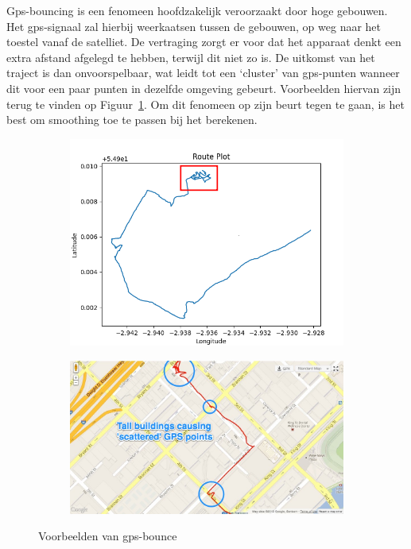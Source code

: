 Gps-bouncing is een fenomeen hoofdzakelijk veroorzaakt door hoge gebouwen. Het
\ac{gps}-signaal zal hierbij weerkaatsen tussen de gebouwen, op weg naar het
toestel vanaf de satelliet. De vertraging zorgt er voor dat het apparaat denkt
een extra afstand afgelegd te hebben, terwijl dit niet zo is. De uitkomst van
het traject is dan onvoorspelbaar, wat leidt tot een `cluster' van
\ac{gps}-punten wanneer dit voor een paar punten in dezelfde omgeving gebeurt.
Voorbeelden hiervan zijn terug te vinden op Figuur~\ref{fig:gps_bounce}. Om dit
fenomeen op zijn beurt tegen te gaan, is het best om smoothing toe te passen
bij het berekenen.
\begin{figure}
    \centering
    \begin{subfigure}[b]{0.49\textwidth}
        \centering
        \includegraphics[width=\textwidth]{fig/Afwijkingen&Analyses/Crooked Routes/Crooked GPS Route_Cart.png}
    \end{subfigure}
    \begin{subfigure}[b]{0.49\textwidth}
        \centering
        \includegraphics[width=\textwidth]{fig/Afwijkingen&Analyses/Crooked Routes/GPS_bounce_map.jpg}
    \end{subfigure}
    \caption{Voorbeelden van gps-bounce~\cite{BadGPSDa19:online}}\label{fig:gps_bounce}
\end{figure}

